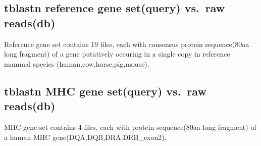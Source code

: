 \documentclass[]{article}
\newenvironment{Shaded}{\begin{snugshade}}{\end{snugshade}}
\newcommand{\KeywordTok}[1]{\textcolor[rgb]{0.13,0.29,0.53}{\textbf{#1}}}
\newcommand{\StringTok}[1]{\textcolor[rgb]{0.31,0.60,0.02}{#1}}
\newcommand{\CommentTok}[1]{\textcolor[rgb]{0.56,0.35,0.01}{\textit{#1}}}
\newcommand{\FunctionTok}[1]{\textcolor[rgb]{0.00,0.00,0.00}{#1}}
\newcommand{\VariableTok}[1]{\textcolor[rgb]{0.00,0.00,0.00}{#1}}
\newcommand{\ExtensionTok}[1]{#1}
\newcommand{\NormalTok}[1]{#1}
\begin{document}
\subsection{tblastn reference gene set(query) vs.~raw
reads(db)}\label{tblastn-reference-gene-setquery-vs.raw-readsdb}

Reference gene set contains 19 files, each with consensus protein
sequence(80aa long fragment) of a gene putatively occuring in a single
copy in reference mammal species (human,cow,horse,pig,mouse).

\begin{Shaded}
\end{Shaded}

\subsection{tblastn MHC gene set(query) vs.~raw
reads(db)}\label{tblastn-mhc-gene-setquery-vs.raw-readsdb}

MHC gene set contains 4 files, each with protein sequence(80aa long
fragment) of a human MHC gene(DQA,DQB,DRA,DRB\_exon2).
\end{document}
